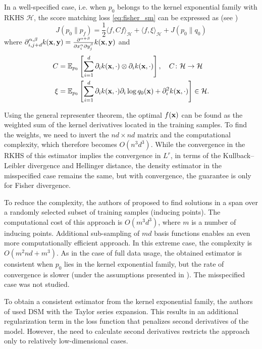 In a well-specified case, i.e. when $p_0$ belongs to the kernel exponential family with RKHS
$\mathcal{H}$, the score matching loss \eqref{eq:fisher_sm}
can be expressed as (see \cite{Gretton2013})
\begin{equation}
    \label{eq:sm_kernel}
    J(p_0 \| p_f) =
    \frac{1}{2} \langle f, Cf\rangle_{\mathcal{H}} + \langle f, \xi\rangle_{\mathcal{H}} + J(p_0 \| q_0)
\end{equation}
where
$\partial^{\alpha,\beta}_{i, j + d} k({\bf x, \bf y}) =
\frac{\partial^{\alpha + \beta}}{\partial x_i^{\alpha}\partial y_j^{\beta}}k({\bf x, \bf y})$
and
\begin{align*}
    C &= \mathbb{E}_{p_0} \left[
        \sum_{i = 1}^d \partial_i k ({\bf  x}, \cdot) \otimes \partial_i k ({\bf  x}, \cdot)
    \right], \quad C \colon \mathcal{H} \to \mathcal{H} \\
    \xi &= \mathbb{E}_{p_0} \left[
        \sum_{i = 1}^d \partial_i k ({\bf  x}, \cdot)\partial_i \log q_0({\bf x}) +
        \partial^2_i k ({\bf  x}, \cdot)
        \right] \in \mathcal{H}.
\end{align*}

Using the general representer theorem, the optimal $f({\bf x})$ can be found
as the weighted sum of the kernel derivatives located in the training samples.
To find the weights, we need to invert the $nd \times nd$ matrix and the computational
complexity, which therefore becomes $O(n^3d^3)$.
While the convergence in the RKHS of this estimator implies the convergence in $L^r$,
in terms of the Kullback–Leibler divergence and Hellinger distance, the density estimator in the misspecified case remains the same,
but with convergence, the guarantee is only for Fisher divergence.

To reduce the complexity, the authors of \cite{sutherland2017efficient} proposed to
find solutions in a span over a randomly selected subset of training samples (inducing points).
The computational cost of this approach is $O(m^3d^3)$,
where $m$ is a number of inducing points.
Additional sub-sampling of $md$ basis functions enables an even more computationally efficient
approach.
In this extreme case, the complexity is $O(m^2nd + m^3)$.
As in the case of full data usage, the obtained estimator is consistent when $p_0$
lies in the kernel exponential family,
but the rate of convergence is slower (under the assumptions presented in \cite{sutherland2017efficient}).
The misspecified case was not studied.

To obtain a consistent estimator from the kernel exponential family,
the authors of \cite{GrettonDeep} used DSM with the Taylor series expansion.
This results in an additional regularization term in the loss function
that penalizes second derivatives of the model.
However, the need to calculate second derivatives restricts the approach only to
relatively low-dimensional cases.

